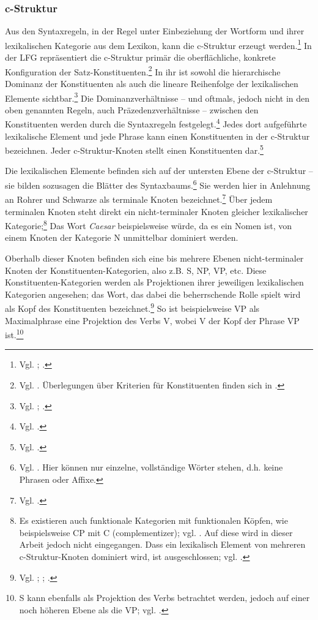 \documentclass[12pt,a4paper]{article}
\begin{document}
\subsubsection{c-Struktur}
Aus den Syntaxregeln, in der Regel unter Einbeziehung der Wortform und ihrer lexikalischen Kategorie aus dem Lexikon, kann die c-Struktur erzeugt werden.\footnote{Vgl. \cite[14]{Rohrer}; \cite[6]{Skript}.} In der LFG repräsentiert die c-Struktur primär die oberflächliche, konkrete Konfiguration der Satz-Konstituenten.\footnote{Vgl. \cite[47]{Dal}. Überlegungen über Kriterien für Konstituenten finden sich in \cite[48-9]{Dal}.} In ihr ist sowohl die hierarchische Dominanz der Konstituenten als auch die lineare Reihenfolge der lexikalischen Elemente sichtbar.\footnote{Vgl. \cite[7]{Dal}; \cite[13]{Rohrer}.} Die Dominanzverhältnisse -- und oftmals, jedoch nicht in den oben genannten Regeln, auch Präzedenzverhältnisse -- zwischen den Konstituenten werden durch die Syntaxregeln festgelegt.\footnote{Vgl. \cite[19]{Rohrer}.} Jedes dort aufgeführte lexikalische Element und jede Phrase kann einen Konstituenten in der c-Struktur bezeichnen. Jeder c-Struktur-Knoten stellt einen Konstituenten dar.\footnote{Vgl. \cite[5]{Skript}.} 

Die lexikalischen Elemente befinden sich auf der untersten Ebene der c-Struktur -- sie bilden sozusagen die Blätter des Syntaxbaums.\footnote{Vgl. \cite[7]{Dal}. Hier können nur einzelne, vollständige Wörter stehen, d.h. keine Phrasen oder Affixe.} Sie werden hier in Anlehnung an Rohrer und Schwarze als terminale Knoten bezeichnet.\footnote{Vgl. \cite[14; 61]{Rohrer}.} Über jedem terminalen Knoten steht direkt ein nicht-terminaler Knoten gleicher lexikalischer Kategorie;\footnote{Es existieren auch funktionale Kategorien mit funktionalen Köpfen, wie beispielsweise CP mit C (complementizer); vgl. \cite[46; 53; 63-4]{Dal}. Auf diese wird in dieser Arbeit jedoch nicht eingegangen. Dass ein lexikalisch Element von mehreren c-Struktur-Knoten dominiert wird, ist ausgeschlossen; vgl. \cite[63]{Skript}.} Das Wort \textit{Caesar} beispielsweise würde, da es ein Nomen ist, von einem Knoten der Kategorie N unmittelbar dominiert werden.

Oberhalb dieser Knoten befinden sich eine bis mehrere Ebenen nicht-terminaler Knoten der Konstituenten-Kategorien, also z.B. S, NP, VP, etc. Diese Konstituenten-Kategorien werden als Projektionen ihrer jeweiligen lexikalischen Kategorien angesehen; das Wort, das dabei die beherrschende Rolle spielt wird als Kopf des Konstituenten bezeichnet.\footnote{Vgl. \cite[13; 15]{Rohrer}; \cite[64]{Dal}; \cite[5; 28]{Skript}.} So ist beispielsweise VP als Maximalphrase eine Projektion des Verbs V, wobei V der Kopf der Phrase VP ist.\footnote{S kann ebenfalls als Projektion des Verbs betrachtet werden, jedoch auf einer noch höheren Ebene als die VP; vgl. \cite[15]{Rohrer}.} 
\end{document}
